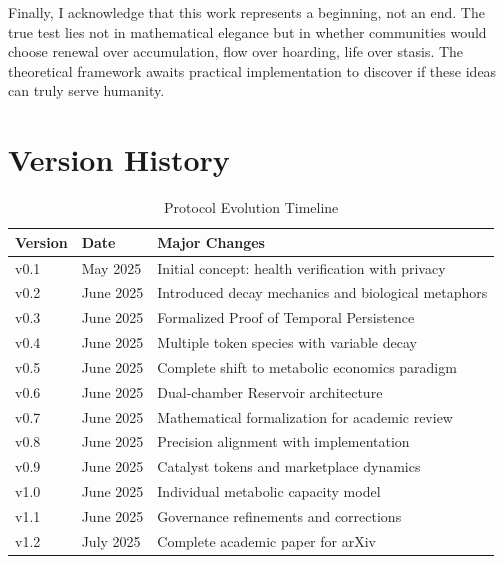 \documentclass[11pt,letterpaper]{article}
\begin{document}
Finally, I acknowledge that this work represents a beginning, not an end. The true test lies not in mathematical elegance but in whether communities would choose renewal over accumulation, flow over hoarding, life over stasis. The theoretical framework awaits practical implementation to discover if these ideas can truly serve humanity.

\section{Version History}

\begin{table}[H]
\centering
\caption{Protocol Evolution Timeline}
\begin{tabular}{lll}
\toprule
\textbf{Version} & \textbf{Date} & \textbf{Major Changes} \\
\midrule
v0.1 & May 2025 & Initial concept: health verification with privacy \\
v0.2 & June 2025 & Introduced decay mechanics and biological metaphors \\
v0.3 & June 2025 & Formalized Proof of Temporal Persistence \\
v0.4 & June 2025 & Multiple token species with variable decay \\
v0.5 & June 2025 & Complete shift to metabolic economics paradigm \\
v0.6 & June 2025 & Dual-chamber Reservoir architecture \\
v0.7 & June 2025 & Mathematical formalization for academic review \\
v0.8 & June 2025 & Precision alignment with implementation \\
v0.9 & June 2025 & Catalyst tokens and marketplace dynamics \\
v1.0 & June 2025 & Individual metabolic capacity model \\
v1.1 & June 2025 & Governance refinements and corrections \\
v1.2 & July 2025 & Complete academic paper for arXiv \\
\bottomrule
\end{tabular}
\end{table}
\end{document}
